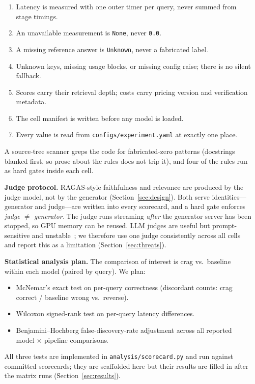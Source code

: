 \begin{enumerate}
    \item Latency is measured with one outer timer per query, never
          summed from stage timings.
    \item An unavailable measurement is \texttt{None}, never
          \texttt{0.0}.
    \item A missing reference answer is \texttt{Unknown}, never a
          fabricated label.
    \item Unknown keys, missing usage blocks, or missing config raise;
          there is no silent fallback.
    \item Scores carry their retrieval depth; costs carry pricing
          version and verification metadata.
    \item The cell manifest is written before any model is loaded.
    \item Every value is read from \texttt{configs/experiment.yaml} at
          exactly one place.
\end{enumerate}

A source-tree scanner greps the code for fabricated-zero patterns
(docstrings blanked first, so prose about the rules does not trip it),
and four of the rules run as hard gates inside each cell.

\textbf{Judge protocol.}
RAGAS-style faithfulness and relevance are produced by the judge model,
not by the generator (Section~\ref{sec:design}). Both serve
identities---generator and judge---are written into every scorecard, and
a hard gate enforces \emph{judge $\neq$ generator}. The judge runs
streaming \emph{after} the generator server has been stopped, so GPU
memory can be reused. LLM judges are useful but prompt-sensitive and
unstable~\cite{murugaraj2025ragvue}; we therefore use one judge
consistently across all cells and report this as a limitation
(Section~\ref{sec:threats}).

\textbf{Statistical analysis plan.}
The comparison of interest is crag vs.\ baseline within each model
(paired by query). We plan:

\begin{itemize}
    \item McNemar's exact test on per-query correctness
          (discordant counts: crag correct / baseline wrong vs.\ reverse).
    \item Wilcoxon signed-rank test on per-query latency differences.
    \item Benjamini--Hochberg false-discovery-rate adjustment across all
          reported model $\times$ pipeline comparisons.
\end{itemize}

All three tests are implemented in \texttt{analysis/scorecard.py} and run
against committed scorecards; they are scaffolded here but their results
are filled in after the matrix runs (Section~\ref{sec:results}).
